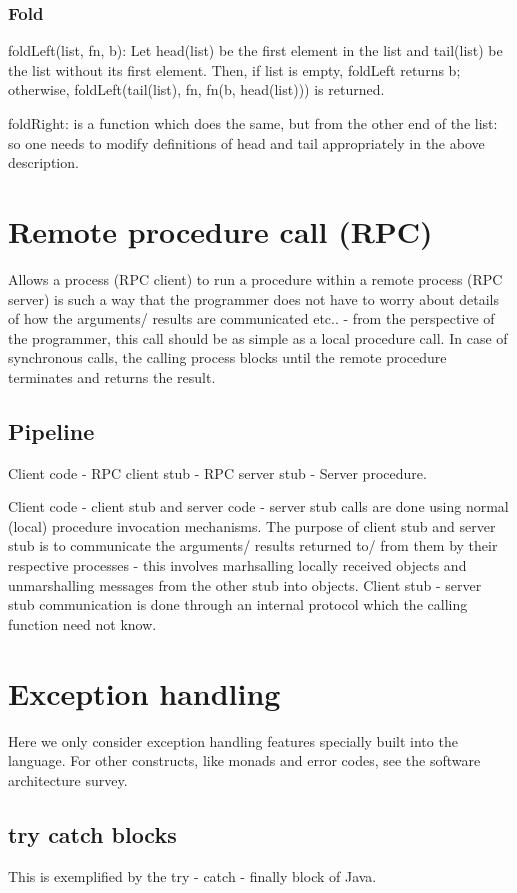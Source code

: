 \documentclass[oneside, article]{memoir}
\begin{document}
\subsubsection{Fold}
foldLeft(list, fn, b): Let head(list) be the first element in the list and tail(list) be the list without its first element. Then, if list is empty, foldLeft returns b; otherwise, foldLeft(tail(list), fn, fn(b, head(list))) is returned.

foldRight: is a function which does the same, but from the other end of the list: so one needs to modify definitions of head and tail appropriately in the above description.

\section{Remote procedure call (RPC)}
Allows a process (RPC client) to run a procedure within a remote process (RPC server) is such a way that the programmer does not have to worry about details of how the arguments/ results are communicated etc.. - from the perspective of the programmer, this call should be as simple as a local procedure call. In case of synchronous calls, the calling process blocks until the remote procedure terminates and returns the result.

\subsection{Pipeline}
Client code - RPC client stub - RPC server stub - Server procedure.

Client code - client stub  and server code - server stub calls are done using normal (local) procedure invocation mechanisms. The purpose of client stub and server stub is to communicate the arguments/ results returned to/ from them by their respective processes - this involves marhsalling locally received objects and unmarshalling messages from the other stub into objects. Client stub - server stub communication is done through an internal protocol which the calling function need not know.

\section{Exception handling}
Here we only consider exception handling features specially built into the language. For other constructs, like monads and error codes, see the software architecture survey.

\subsection{try catch blocks}
This is exemplified by the try - catch - finally block of Java.
\end{document}
